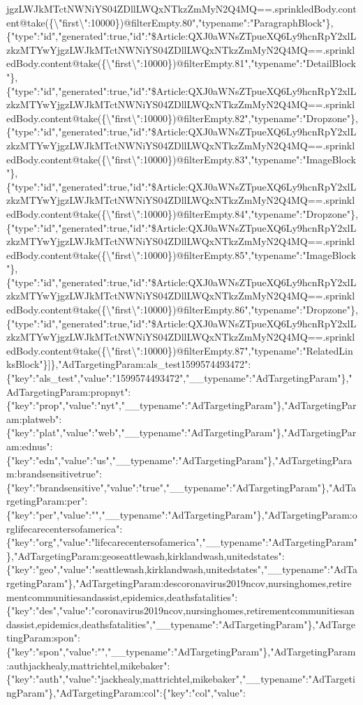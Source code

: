 jgzLWJkMTctNWNiYS04ZDllLWQxNTkzZmMyN2Q4MQ==.sprinkledBody.content@take(\{\textbackslash{}"first\textbackslash{}":10000\})@filterEmpty.80","typename":"ParagraphBlock"\},\{"type":"id","generated":true,"id":"\$Article:QXJ0aWNsZTpueXQ6Ly9hcnRpY2xlLzkzMTYwYjgzLWJkMTctNWNiYS04ZDllLWQxNTkzZmMyN2Q4MQ==.sprinkledBody.content@take(\{\textbackslash{}"first\textbackslash{}":10000\})@filterEmpty.81","typename":"DetailBlock"\},\{"type":"id","generated":true,"id":"\$Article:QXJ0aWNsZTpueXQ6Ly9hcnRpY2xlLzkzMTYwYjgzLWJkMTctNWNiYS04ZDllLWQxNTkzZmMyN2Q4MQ==.sprinkledBody.content@take(\{\textbackslash{}"first\textbackslash{}":10000\})@filterEmpty.82","typename":"Dropzone"\},\{"type":"id","generated":true,"id":"\$Article:QXJ0aWNsZTpueXQ6Ly9hcnRpY2xlLzkzMTYwYjgzLWJkMTctNWNiYS04ZDllLWQxNTkzZmMyN2Q4MQ==.sprinkledBody.content@take(\{\textbackslash{}"first\textbackslash{}":10000\})@filterEmpty.83","typename":"ImageBlock"\},\{"type":"id","generated":true,"id":"\$Article:QXJ0aWNsZTpueXQ6Ly9hcnRpY2xlLzkzMTYwYjgzLWJkMTctNWNiYS04ZDllLWQxNTkzZmMyN2Q4MQ==.sprinkledBody.content@take(\{\textbackslash{}"first\textbackslash{}":10000\})@filterEmpty.84","typename":"Dropzone"\},\{"type":"id","generated":true,"id":"\$Article:QXJ0aWNsZTpueXQ6Ly9hcnRpY2xlLzkzMTYwYjgzLWJkMTctNWNiYS04ZDllLWQxNTkzZmMyN2Q4MQ==.sprinkledBody.content@take(\{\textbackslash{}"first\textbackslash{}":10000\})@filterEmpty.85","typename":"ImageBlock"\},\{"type":"id","generated":true,"id":"\$Article:QXJ0aWNsZTpueXQ6Ly9hcnRpY2xlLzkzMTYwYjgzLWJkMTctNWNiYS04ZDllLWQxNTkzZmMyN2Q4MQ==.sprinkledBody.content@take(\{\textbackslash{}"first\textbackslash{}":10000\})@filterEmpty.86","typename":"Dropzone"\},\{"type":"id","generated":true,"id":"\$Article:QXJ0aWNsZTpueXQ6Ly9hcnRpY2xlLzkzMTYwYjgzLWJkMTctNWNiYS04ZDllLWQxNTkzZmMyN2Q4MQ==.sprinkledBody.content@take(\{\textbackslash{}"first\textbackslash{}":10000\})@filterEmpty.87","typename":"RelatedLinksBlock"\}{]}\},"AdTargetingParam:als\_test1599574493472":\{"key":"als\_test","value":"1599574493472","\_\_typename":"AdTargetingParam"\},"AdTargetingParam:propnyt":\{"key":"prop","value":"nyt","\_\_typename":"AdTargetingParam"\},"AdTargetingParam:platweb":\{"key":"plat","value":"web","\_\_typename":"AdTargetingParam"\},"AdTargetingParam:ednus":\{"key":"edn","value":"us","\_\_typename":"AdTargetingParam"\},"AdTargetingParam:brandsensitivetrue":\{"key":"brandsensitive","value":"true","\_\_typename":"AdTargetingParam"\},"AdTargetingParam:per":\{"key":"per","value":"","\_\_typename":"AdTargetingParam"\},"AdTargetingParam:orglifecarecentersofamerica":\{"key":"org","value":"lifecarecentersofamerica","\_\_typename":"AdTargetingParam"\},"AdTargetingParam:geoseattlewash,kirklandwash,unitedstates":\{"key":"geo","value":"seattlewash,kirklandwash,unitedstates","\_\_typename":"AdTargetingParam"\},"AdTargetingParam:descoronavirus2019ncov,nursinghomes,retirementcommunitiesandassist,epidemics,deathsfatalities":\{"key":"des","value":"coronavirus2019ncov,nursinghomes,retirementcommunitiesandassist,epidemics,deathsfatalities","\_\_typename":"AdTargetingParam"\},"AdTargetingParam:spon":\{"key":"spon","value":"","\_\_typename":"AdTargetingParam"\},"AdTargetingParam:authjackhealy,mattrichtel,mikebaker":\{"key":"auth","value":"jackhealy,mattrichtel,mikebaker","\_\_typename":"AdTargetingParam"\},"AdTargetingParam:col":\{"key":"col","value":